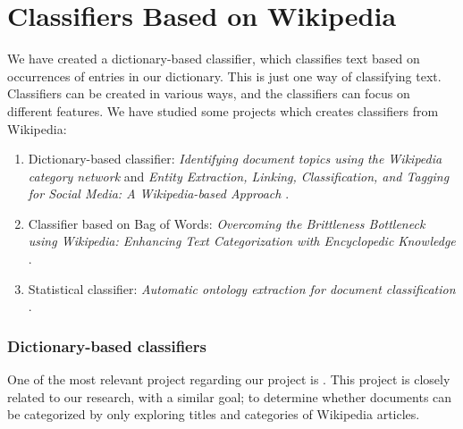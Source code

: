 \section{Classifiers Based on Wikipedia}
\label{sec:classifiers_based_on_wikipedia}

We have created a dictionary-based classifier, which classifies text based on occurrences of entries in our dictionary. This is just one way of classifying text. Classifiers can be created in various ways, and the classifiers can focus on different features. We have studied some projects which creates classifiers from Wikipedia: 
\begin{enumerate}
\item Dictionary-based classifier: \emph{Identifying document topics using the Wikipedia category network} \cite{schonhofen2009identifying} and \emph{Entity Extraction, Linking, Classification, and Tagging for Social Media: A Wikipedia-based Approach} \cite{entityextraction}.
\item Classifier based on Bag of Words: \emph{Overcoming the Brittleness Bottleneck using Wikipedia: Enhancing Text Categorization with Encyclopedic Knowledge} \cite{brittleness}.
\item Statistical classifier: \emph{Automatic ontology extraction for document classification} \cite{kozlova2005automatic}.
\end{enumerate}

\subsubsection{Dictionary-based classifiers}
One of the most relevant project regarding our project is \cite[][]{schonhofen2009identifying}. This project is closely related to our research, with a similar goal; to determine whether documents can be categorized by only exploring titles and categories of Wikipedia articles. 

